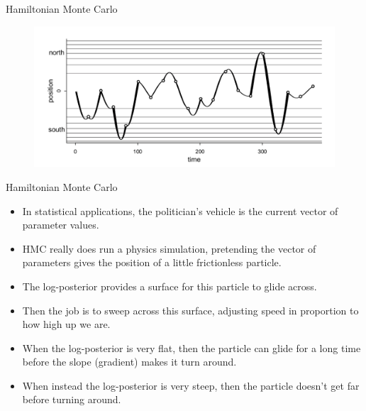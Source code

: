 \documentclass[handout]{beamer}
\begin{document}
\begin{frame}{Hamiltonian Monte Carlo}



 \begin{figure}[h!]
	\centering
	\includegraphics[scale=0.3]{pics/HMC.png}
	\end{figure} 



\end{frame}


\begin{frame}{Hamiltonian Monte Carlo}
\scriptsize{

\begin{itemize}
\item In statistical applications, the politician's vehicle is the current vector of parameter values. 


\item HMC really does run a physics simulation, pretending the vector of parameters gives the position of a little frictionless particle. 

\item The log-posterior provides a surface for this particle to glide across. 


\item Then the job is to sweep across this surface, adjusting speed in proportion to how high up we are.



\item When the log-posterior is very flat, then the particle can glide for a long time before the slope (gradient) makes it turn around.

\item When instead the log-posterior is very steep, then the particle doesn’t get far before turning around.

\end{itemize}


} 
\end{frame}
\end{document}
